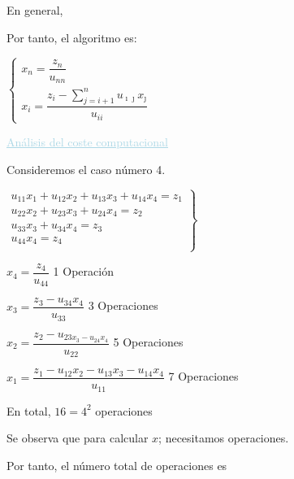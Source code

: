 \documentclass[12pt]{article}
\begin{document}
En general,
\begin{center}
\end{center}
Por tanto, el algoritmo es:

\hspace{1cm}$\left\lbrace\begin{array}{l}
x_{n}=\dfrac{z_{n}}{u_{nn}}\\
x_i=\dfrac{z_i-\displaystyle\sum_{j=i+1}^{n}u_{\imath\jmath  }x_{\jmath}}{u_{ii}}\end{array}\right.$

\textcolor{lightblue}{\underline{Análisis del coste
computacional}}

Consideremos el caso número 4.

$\left.\begin{array}{r}
u_{11}x_1+u_{12}x_2+u_{13}x_3+u_{14}x_4=z_1\\
u_{22}x_2+u_{23}x_3+u_{24}x_4=z_2\\
u_{33}x_3+u_{34}x_4=z_3\\
u_{44}x_4=z_4\\
\end{array}\right\rbrace$

$x_4=\dfrac{z_4}{u_{44}}$\hspace{1cm} 1 Operación

$x_3=\dfrac{z_3-u_{34}x_4}{u_{33}}$\hspace{1cm} 3 Operaciones

$x_2=\dfrac{z_2-u_{23x_3-u_{24}x_4}}{u_{22}}$\hspace{1cm} 5
Operaciones

$x_1=\dfrac{z_1-u_{12}x_2-u_{13}x_3-u_{14}x_4}{u_{11}}$\hspace{1cm}
7 Operaciones

En total, $16=4^2$ operaciones

Se observa que para calcular $x$; necesitamos
 operaciones.

Por tanto, el número total de operaciones es 

\end{document}
